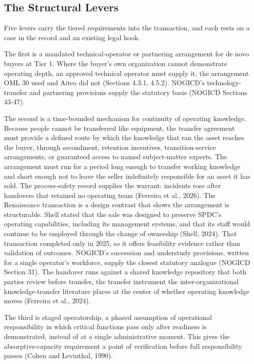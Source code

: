 \hypertarget{the-structural-levers}{%
\subsection{The Structural Levers}\label{the-structural-levers}}

Five levers carry the tiered requirements into the transaction, and each
rests on a case in the record and an existing legal hook.

The first is a mandated technical-operator or partnering arrangement for
de novo buyers at Tier 1. Where the buyer's own organization cannot
demonstrate operating depth, an approved technical operator must supply
it, the arrangement OML 30 used and Aiteo did not (Sections 4.3.1,
4.5.2). NOGICD's technology-transfer and partnering provisions supply
the statutory basis (NOGICD Sections 43-47).

The second is a time-bounded mechanism for continuity of operating
knowledge. Because people cannot be transferred like equipment, the
transfer agreement must provide a defined route by which the knowledge
that ran the asset reaches the buyer, through secondment, retention
incentives, transition-service arrangements, or guaranteed access to
named subject-matter experts. The arrangement must run for a period long
enough to transfer working knowledge and short enough not to leave the
seller indefinitely responsible for an asset it has sold. The
process-safety record supplies the warrant: incidents rose after
handovers that retained no operating team (Ferreira et al., 2026). The
Renaissance transaction is a design contrast that shows the arrangement
is structurable. Shell stated that the sale was designed to preserve
SPDC's operating capabilities, including its management systems, and
that its staff would continue to be employed through the change of
ownership (Shell, 2024). That transaction completed only in 2025, so it
offers feasibility evidence rather than validation of outcomes. NOGICD's
succession and understudy provisions, written for a single operator's
workforce, supply the closest statutory analogue (NOGICD Section 31).
The handover runs against a shared knowledge repository that both
parties review before transfer, the transfer instrument the
inter-organizational knowledge-transfer literature places at the center
of whether operating knowledge moves (Ferreira et al., 2024).

The third is staged operatorship, a phased assumption of operational
responsibility in which critical functions pass only after readiness is
demonstrated, instead of at a single administrative moment. This gives
the absorptive-capacity requirement a point of verification before full
responsibility passes (Cohen and Levinthal, 1990).

